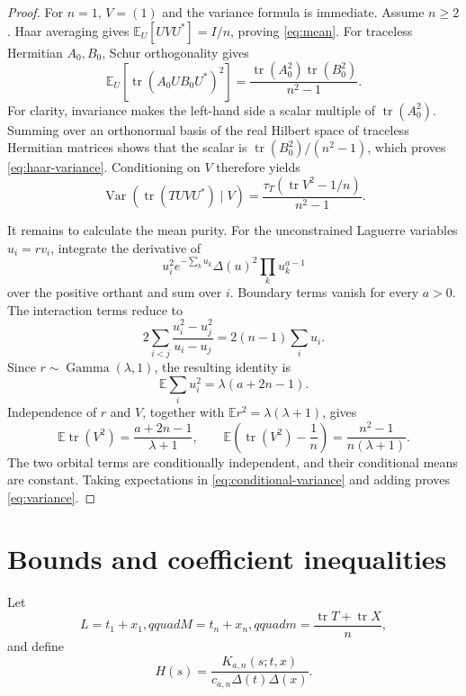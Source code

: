 \documentclass[11pt]{article}
\theoremstyle{definition}
\theoremstyle{remark}
\newcommand{\E}{\mathbb{E}}
\newcommand{\tr}{\operatorname{tr}}
\begin{document}
\begin{proof}
For $n=1$, $V=(1)$ and the variance formula is immediate. Assume $n\ge2$.
Haar averaging gives $\E_U[UVU^*]=I/n$, proving
\eqref{eq:mean}. For traceless Hermitian $A_0,B_0$, Schur orthogonality gives
\begin{equation}\label{eq:haar-variance}
\E_U[\tr(A_0UB_0U^*)^2]
=\frac{\tr(A_0^2)\tr(B_0^2)}{n^2-1}.
\end{equation}
For clarity, invariance makes the left-hand side a scalar multiple of
$\tr(A_0^2)$. Summing over an orthonormal basis of the real Hilbert space of
traceless Hermitian matrices shows that the scalar is
$\tr(B_0^2)/(n^2-1)$, which proves \eqref{eq:haar-variance}.
Conditioning on $V$ therefore yields
\begin{equation}\label{eq:conditional-variance}
\operatorname{Var}(\tr(TUVU^*)\mid V)
=\frac{\tau_T(\tr V^2-1/n)}{n^2-1}.
\end{equation}

It remains to calculate the mean purity. For the unconstrained Laguerre
variables $u_i=rv_i$, integrate the derivative of
\[
u_i^2e^{-\sum_k u_k}\Delta(u)^2\prod_k u_k^{a-1}
\]
over the positive orthant and sum over $i$. Boundary terms vanish for every
$a>0$. The interaction terms reduce to
\[
2\sum_{i<j}\frac{u_i^2-u_j^2}{u_i-u_j}
=2(n-1)\sum_i u_i.
\]
Since $r\sim\operatorname{Gamma}(\lambda,1)$, the resulting identity is
\[
\E\sum_i u_i^2=\lambda(a+2n-1).
\]
Independence of $r$ and $V$, together with
$\E r^2=\lambda(\lambda+1)$, gives
\begin{equation}\label{eq:purity}
\E\tr(V^2)=\frac{a+2n-1}{\lambda+1},
\qquad
\E\left(\tr(V^2)-\frac1n\right)
=\frac{n^2-1}{n(\lambda+1)}.
\end{equation}
The two orbital terms are conditionally independent, and their conditional
means are constant. Taking expectations in
\eqref{eq:conditional-variance} and adding proves
\eqref{eq:variance}.
\end{proof}

\section{Bounds and coefficient inequalities}

Let
\begin{equation}\label{eq:LUm}
L=t_1+x_1,qquad M=t_n+x_n,qquad
m=\frac{\tr T+\tr X}{n},
\end{equation}
and define
\begin{equation}\label{eq:H}
H(s)=\frac{K_{a,n}(s;t,x)}{c_{a,n}\Delta(t)\Delta(x)}.
\end{equation}
\end{document}

